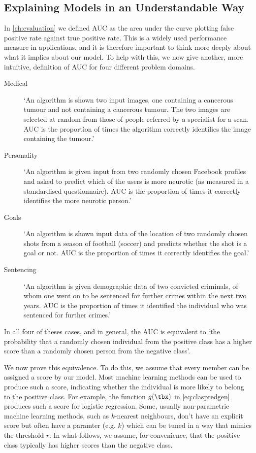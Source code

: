 \subsection{Explaining Models in an Understandable Way} \label{sec:understandable}

In \cref{ch:evaluation} we defined AUC as the area under the curve plotting false positive rate against true positive rate. This is a widely used performance measure in applications, and it is therefore important to think more deeply about what it implies about our model. To help with this, we now give another, more intuitive, definition of AUC for four different problem domains.
\begin{description}
\item[Medical] `An algorithm is shown two input images, one containing a cancerous tumour and not containing a cancerous tumour. The two images are selected at random from those of people referred by a specialist for a scan. AUC is the proportion of times the algorithm correctly identifies the image containing the tumour.'

\item[Personality] `An algorithm is given input from two randomly chosen Facebook profiles and asked to predict which of the users is more neurotic (as measured in a standardised questionnaire). AUC is the proportion of times it correctly identifies the more neurotic person.'

\item[Goals] `An algorithm is shown input data of the location of two randomly chosen shots from a season of football (soccer) and predicts whether the shot is a goal or not. AUC is the proportion of times it correctly identifies the goal.'

\item[Sentencing] `An algorithm is given demographic data of two convicted criminals, of whom one went on to be sentenced for further crimes within the next two years. AUC is the proportion of times it identified the individual who was sentenced for further crimes.'

\end{description}
In all four of theses cases, and in general, the AUC is equivalent to `the probability that a randomly chosen individual from the positive class has a higher score than a randomly chosen person from the negative class'.

We now prove this equivalence.  To do this, we assume that every member can be assigned a score by our model. Most machine learning methods can be used to produce such a score, indicating whether the individual is more likely to belong to the positive class. For example, the function $g(\tbx)$ in \eqref{eq:claspredgen} produces such a score for logistic regression. Some, usually non-parametric machine learning methods, such as $k$-nearest neighbours, don't have an explicit score but often have a paramter (e.g. $k$) which can be tuned in a way that mimics the threshold $r$. In what follows, we assume, for convenience, that the positive class typically has higher scores than the negative class.

